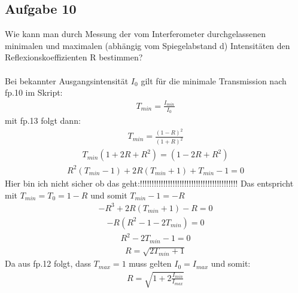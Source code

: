 \documentclass[a4paper,10pt]{scrartcl}
\begin{document}
	\subsection{Aufgabe 10}
	Wie kann man durch Messung der vom Interferometer durchgelassenen minimalen und maximalen
	(abhängig vom Spiegelabstand d) Intensitäten den Reflexionskoeffizienten
	R bestimmen?\\
	\\
	Bei bekannter Ausgangsintensität \(I_{0}\) gilt für die minimale Transmission nach fp.10 im Skript:
	\begin{align*}
	T_{min}=\frac{I_{min}}{I_{0}}
	\end{align*}
	mit fp.13 folgt dann:
	\begin{align*}
	T_{min}=\frac{(1-R)^{2}}{(1+R)^{2}}
	\end{align*}
	\begin{align*}
	T_{min}(1+2R+R^{2})=(1-2R+R^{2})
	\end{align*}
	\begin{align*}
	R^{2}(T_{min}-1)+2R(T_{min}+1)+T_{min}-1=0
	\end{align*}
	Hier bin ich nicht sicher ob das geht:!!!!!!!!!!!!!!!!!!!!!!!!!!!!!!!!!!!!!!!!!!
	Das entspricht mit \(T_{min}=T_{0}=1-R\) und somit \(T_{min}-1=-R\)
	\begin{align*}
	-R^{3}+2R(T_{min}+1)-R=0
	\end{align*}
	\begin{align*}
	-R(R^{2}-1-2T_{min})=0
	\end{align*}
	\begin{align*}
	R^{2}-2T_{min}-1=0
	\end{align*}
	\begin{align*}
	R=\sqrt{2T_{min}+1}
	\end{align*}
	Da aus fp.12 folgt, dass \(T_{max}=1\) muss gelten \(I_{0}=I_{max}\) und somit:
	\begin{align*}
	R=\sqrt{1+2\frac{I_{min}}{I_{max}}}
	\end{align*}
	
\end{document}
